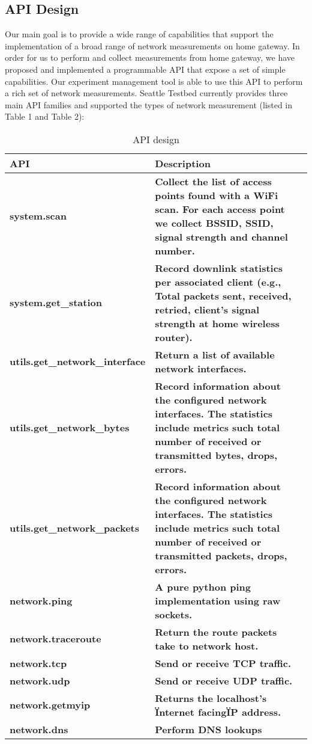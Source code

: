 \subsection{API Design}
Our main goal is to provide a wide range of capabilities that support the 
implementation of a broad range of network measurements on home gateway. In 
order for us to perform and collect measurements from home gateway, we have 
proposed and implemented a programmable API that expose a set of simple 
capabilities. Our experiment management tool is able to use this API to 
perform a rich set of network measurements. Seattle Testbed currently 
provides three main API families and supported the types of network 
measurement (listed in Table 1 and Table 2):

\begin{table*} %
\scriptsize
\centering
\begin{adjustwidth}{1cm}{-1cm}
\begin{tabular}{|p{}| p{}| m{}|}
\hline
\textbf{API}    &  \textbf{Description} \\
 \hline
 {\bf system.scan} & {\bf Collect the list of access points found with a WiFi scan. For each access point we collect BSSID, SSID, signal strength and channel number.} \\
\hline
 {\bf system.get\_station} & {\bf Record downlink statistics per associated client (e.g., Total packets sent, received, retried, client's signal strength at home wireless router).} \\
\hline
 {\bf utils.get\_network\_interface} & {\bf Return a list of available network interfaces.} \\
\hline
 {\bf utils.get\_network\_bytes} & {\bf Record information about the configured network interfaces. The statistics include metrics such total number of received or transmitted bytes, drops, errors.} \\
\hline
 {\bf utils.get\_network\_packets} & {\bf Record information about the configured network interfaces. The statistics include metrics such total number of received or transmitted packets, drops, errors.} \\
\hline
 {\bf network.ping} & {\bf A pure python ping implementation using raw sockets.} \\
\hline
 {\bf network.traceroute} & {\bf Return the route packets take to network host. } \\
\hline
 {\bf network.tcp} & {\bf Send or receive TCP traffic.} \\
\hline
 {\bf network.udp} & {\bf Send or receive UDP traffic.} \\
\hline
 {\bf network.getmyip} & {\bf Returns the localhost's \"Internet facing\" IP address.} \\
\hline
 {\bf network.dns} & {\bf Perform DNS lookups} \\
\hline
\end{tabular}
\end{adjustwidth}
\caption {API design}
\label{table:api_design}
\end{table*}

